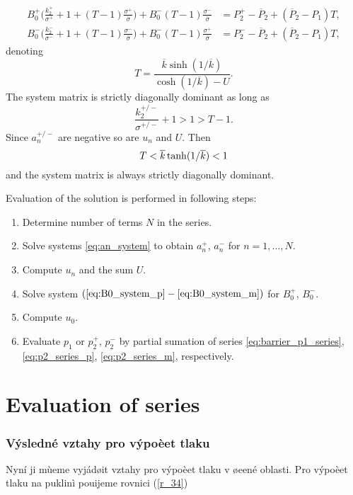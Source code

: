 \documentclass[a4paper,10pt]{article}
\def\ol#1{\overline{#1}}
\begin{document}
\begin{align}
    \label{eq:B0_system_p}
    B_0^+\Big(\frac{k_2^+}{\sigma^+} + 1 +(T-1)\frac{\sigma^+}{\ol{\sigma}}\Big)  + B_0^-(T-1)\frac{\sigma^-}{\ol{\sigma}}
    &= P_2^+ - \ol{P}_2 +  (\ol{P}_2 - P_1) T, \\
%   
    \label{eq:B0_system_m}
    B_0^-\Big(\frac{k_2^-}{\sigma^-} + 1 +(T-1)\frac{\sigma^-}{\ol{\sigma}}\Big)  + B_0^-(T-1)\frac{\sigma^+}{\ol{\sigma}}
    &= P_2^- - \ol{P}_2 +  (\ol{P}_2 - P_1) T, 
\end{align}
denoting
\[
    T  = \frac{\ol{k}\sinh( 1/\ol{k} )}{\cosh(1/\ol{k}) - U}.
\]
The system matrix is strictly diagonally dominant as long as 
\[
    \frac{k_2^{+/-}}{\sigma^{+/-}} + 1 > 1 > T -1.
\]
Since $a_n^{+/-}$ are negative so are $u_n$ and $U$. Then
\[
    T < \ol{k}\, {\rm tanh}( 1/\ol{k} ) < 1
\]
and the system matrix is always strictly diagonally dominant.

Evaluation of the solution is performed in following steps:
\begin{enumerate}
    \item Determine number of terms $N$ in the series.
    \item Solve systems \eqref{eq:an_system} to obtain $a_n^+$, $a_n^-$ for $n=1,\dots, N$.
    \item Compute $u_n$ and the sum $U$.
    \item Solve system $(\ref{eq:B0_system_p} - \ref{eq:B0_system_m})$ for $B_0^+$, $B_0^-$.
    \item Compute $u_0$.
    \item Evaluate $p_1$ or $p_2^+$, $p_2^-$ by partial sumation of series \eqref{eq:barrier_p1_series},
          \eqref{eq:p2_series_p}, \eqref{eq:p2_series_m}, respectively.
\end{enumerate}


\section{Evaluation of series}



\subsubsection{Výsledné vztahy pro výpoèet tlaku}

Nyní ji mùeme vyjádøit vztahy pro výpoèet tlaku v øeené oblasti. Pro výpoèet tlaku na puklinì pouijeme rovnici (\ref{r_34})
\end{document}
